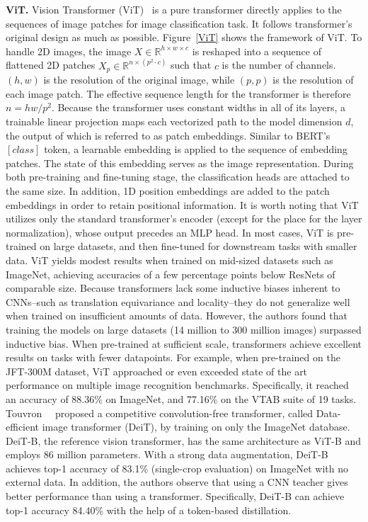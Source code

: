 \noindent\textbf{ViT.}
Vision Transformer (ViT)~ is a pure transformer directly applies to the sequences of image patches for image classification task. It follows transformer's original design as much as possible. Figure~\ref{ViT} shows the framework of ViT. 
To handle 2D images, the image $X\in \mathbb{R}^{h\times w \times c}$ is reshaped into a sequence of flattened 2D patches $X_p\in \mathbb{R}^{n\times (p^2 \cdot c)}$ such that $c$ is the number of channels. $(h,w)$ is the resolution of the original image, while $(p,p)$ is the resolution of each image patch. The effective sequence length for the transformer is therefore $n=hw/p^2$. Because the transformer uses constant widths in all of its layers, a trainable linear projection maps each vectorized path to the model dimension $d$, the output of which is referred to as patch embeddings. 
Similar to BERT's $[class]$ token, a learnable embedding is applied to the sequence of embedding patches. The state of this embedding serves as the image representation. During both pre-training and fine-tuning stage, the classification heads are attached to the same size. In addition, 1D position embeddings are added to the patch embeddings in order to retain positional information. It is worth noting that ViT utilizes only the standard transformer's encoder (except for the place for the layer normalization), whose output precedes an MLP head. In most cases, ViT is pre-trained on large datasets, and then fine-tuned for downstream tasks with smaller data.
ViT yields modest results when trained on mid-sized datasets such as ImageNet, achieving accuracies of a few percentage points below ResNets of comparable size. Because transformers lack some inductive biases inherent to CNNs--such as translation equivariance and locality--they do not generalize well when trained on insufficient amounts of data. However, the authors found that training the models on large datasets (14 million to 300 million images) surpassed inductive bias. When pre-trained  at sufficient scale, transformers achieve excellent results on tasks with fewer datapoints. For example, when pre-trained on the JFT-300M dataset, ViT approached or even exceeded state of the art performance on multiple image recognition benchmarks. Specifically, it reached an accuracy of 88.36\% on ImageNet, and 77.16\% on the VTAB suite of 19 tasks.
Touvron~\etal~ proposed a competitive convolution-free transformer, called Data-efficient image transformer (DeiT), by training on only the ImageNet database. DeiT-B, the reference vision transformer, has the same architecture as ViT-B and employs 86 million parameters. With a strong data augmentation, DeiT-B achieves top-1 accuracy of 83.1\% (single-crop evaluation) on ImageNet with no external data. In addition, the authors observe that using a CNN teacher gives better performance than using a transformer. Specifically, DeiT-B can achieve top-1 accuracy 84.40\% with the help of a token-based distillation. 
